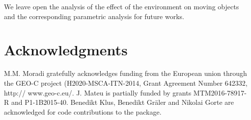 \documentclass[article]{jss}
\begin{document}
  We leave open the analysis of the effect of the environment on moving objects and the corresponding parametric analysis for future works.
  
\section*{Acknowledgments}

M.M. Moradi  gratefully acknowledges funding from the European union through the GEO-C project (H2020-MSCA-ITN-2014, Grant Agreement Number 642332, http:// www.geo-c.eu/. J. Mateu is partially funded by grants MTM2016-78917-R and P1-1B2015-40. Benedikt Klus, Benedikt Gr\"{a}ler and Nikolai Gorte are acknowledged for code contributions to the  package.







\end{document}
